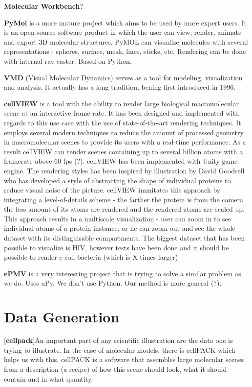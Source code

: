 \documentclass[
  digital, %
  table,   %
  nolof,     %
  nolot,     %
]{fithesis3}
\begin{document}
\textbf{Molecular Workbench}?

\textbf{PyMol} is a more mature project which aims to be used by more expert users. It is an open-source software product in which the user can view, render, animate and export 3D molecular structures. PyMOL can visualize molecules with several representations - spheres, surface, mesh, lines, sticks, etc. Rendering can be done with internal ray caster. Based on Python.

\textbf{VMD} (Visual Molecular Dynamics) serves as a tool for modeling, visualization and analysis. It actually has a long tradition, bening first introduced in 1996.

\textbf{cellVIEW} is a tool with the ability to render large biological macromolecular scene at an interactive frame-rate. It has been designed and implemented with regards to this use case with the use of state-of-the-art rendering techniques. It employs several modern techniques to reduce the amount of processed geometry in macromolecular scenes to provide its users with a real-time performance. As a result cellVIEW can render scenes containing up to several billion atoms with a framerate above 60 fps (?). cellVIEW has been implemented with Unity game engine. The rendering styles has been inspired by illustration by David Goodsell who has developed a style of abstracting the shape of individual proteins to reduce visual noise of the picture. cellVIEW immitates this approach by integrating a level-of-details scheme - the farther the protein is from the camera the less amount of its atoms are rendered and the rendered atoms are scaled up. This approach results in a multiscale visualization - user can zoom in to see individual atoms of a protein instance, or he can zoom out and see the whole dataset with its distinguisable compartments. The biggest dataset that has been possible to visualize is HIV, however tests have been done and it should be possible to render e-coli bacteria (which is X times larger)

\textbf{ePMV} is a very interesting project that is trying to solve a similar problem as we do. Uses uPy. We don't use Python. Our method is more general (?).

\section{Data Generation}
[\textbf{cellpack}]An important part of any scientific illustration are the data one is trying to illustrate. In the case of molecular models, there is cellPACK which helps us with this. cellPACK is a software that assembles large molecular scenes from a description (a recipe) of how this scene should look, what it should contain and in what quantity.
\end{document}
